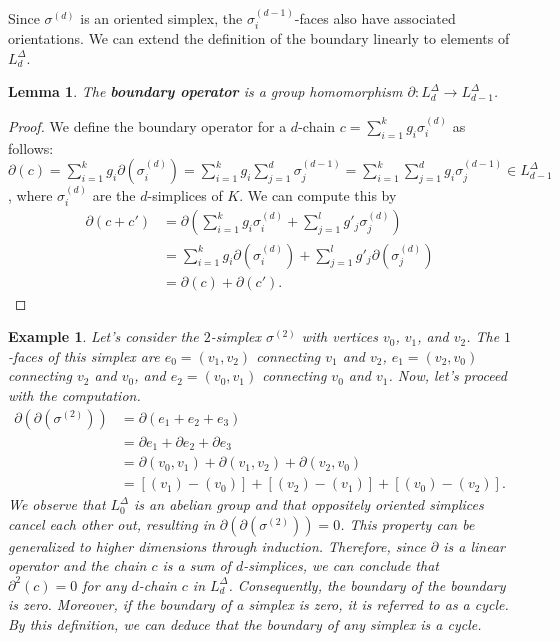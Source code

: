 \documentclass{amsart}
\newtheorem{lemma}[definition]{Lemma}
\newtheorem{example}[definition]{Example}
\begin{document}
Since $\sigma^{(d)}$ is an oriented simplex, the $\sigma^{(d-1)}_i$-faces also have associated orientations. We can extend the definition of the boundary linearly to elements of $L^\Delta_d$.

\begin{lemma}
The \textbf{boundary operator} is a group homomorphism $\partial: L^\Delta_d \rightarrow L^\Delta_{d-1}$.
\end{lemma}
\begin{proof}
We define the boundary operator for a $d$-chain $c = \sum_{i=1}^{k} g_i \sigma_i^{(d)}$ as follows: $\partial(c) = \sum_{i=1}^{k} g_i \partial(\sigma_i^{(d)}) = \sum_{i=1}^{k} g_i \sum_{j=1}^{d} \sigma_j^{(d-1)} = \sum_{i=1}^{k} \sum_{j=1}^{d} g_i \sigma_j^{(d-1)} \in L^\Delta_{d-1}$, where $\sigma_i^{(d)}$ are the $d$-simplices of $K$. We can compute this by
\begin{align}
\partial(c + c') &= \partial(\sum_{i=1}^{k} g_i \sigma_i^{(d)} + \sum_{j=1}^{l} g'_j \sigma_j^{(d)}) \\
&= \sum_{i=1}^{k} g_i \partial(\sigma_i^{(d)}) + \sum_{j=1}^{l} g'_j \partial(\sigma_j^{(d)}) \\
&= \partial(c) + \partial(c').
\end{align}
\end{proof}

\begin{example}
Let's consider the $2$-simplex $\sigma^{(2)}$ with vertices $v_0$, $v_1$, and $v_2$. The $1$-faces of this simplex are $e_0 = (v_1,v_2)$ connecting $v_1$ and $v_2$, $e_1 = (v_2,v_0)$ connecting $v_2$ and $v_0$, and $e_2 = (v_0,v_1)$ connecting $v_0$ and $v_1$. Now, let's proceed with the computation.
\begin{align}
\partial(\partial(\sigma^{(2)})) &= \partial (e_1+e_2+e_3) \\
&= \partial e_1 + \partial e_2 + \partial e_3 \\
&= \partial(v_0,v_1) + \partial(v_1,v_2) + \partial(v_2,v_0) \\
&= [(v_1)-(v_0)] + [(v_2)-(v_1)]+[(v_0)-(v_2)].
\end{align}
We observe that $L^\Delta_0$ is an abelian group and that oppositely oriented simplices cancel each other out, resulting in $\partial(\partial(\sigma^{(2)})) = 0$. This property can be generalized to higher dimensions through induction. Therefore, since $\partial$ is a linear operator and the chain $c$ is a sum of $d$-simplices, we can conclude that $\partial^2(c) = 0$ for any $d$-chain $c$ in $L^\Delta_d$. Consequently, the boundary of the boundary is zero. Moreover, if the boundary of a simplex is zero, it is referred to as a \emph{cycle}. By this definition, we can deduce that the boundary of any simplex is a cycle.
\end{example}
\end{document}
